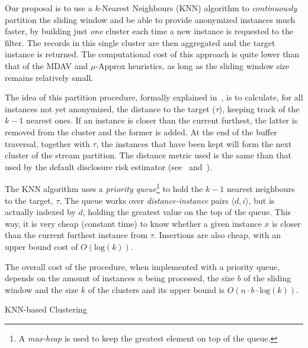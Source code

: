 Our proposal is to use a $k$-Nearest Neighbours (KNN) algorithm to \textit{continuously} partition the sliding window and be able to provide anonymized instances much faster, by building just \textit{one} cluster each time a new instance is requested to the filter. The records in this single cluster are then aggregated and the target instance is returned. The computational cost of this approach is quite lower than that of the MDAV and $\mu$-Approx heuristics, as long as the sliding window size remains relatively small.

The idea of this partition procedure, formally explained in~, is to calculate, for all instances not yet anonymized, the distance to the target ($\tau$), keeping track of the $k-1$ nearest ones. If an instance is closer than the current furthest, the latter is removed from the cluster and the former is added. At the end of the buffer traversal, together with $\tau$, the instances that have been kept will form the next cluster of the stream partition. The distance metric used is the same than that used by the default disclosure risk estimator (see~ and~).

The KNN algorithm uses a \textit{priority queue}\footnote{A \textit{max-heap} is used to keep the greatest element on top of the queue.} to hold the $k-1$ nearest neighbours to the target, $\tau$. The queue works over \textit{distance-instance} pairs $\langle d, i\rangle$, but is actually indexed by $d$, holding the greatest value on the top of the queue. This way, it is very cheap (constant time) to know whether a given instance $x$ is closer than the current furthest instance from $\tau$. Insertions are also cheap, with an upper bound cost of $O(\mathrm{log}(k))$.

The overall cost of the procedure, when implemented with a priority queue, depends on the amount of instances $n$ being processed, the size $b$ of the sliding window and the size $k$ of the clusters and its upper bound is $O(n \cdot b \cdot \mathrm{log}(k))$.

\begin{algorithm}
\caption{KNN-based Clustering\label{al:KNN-partition}}
\end{algorithm}

